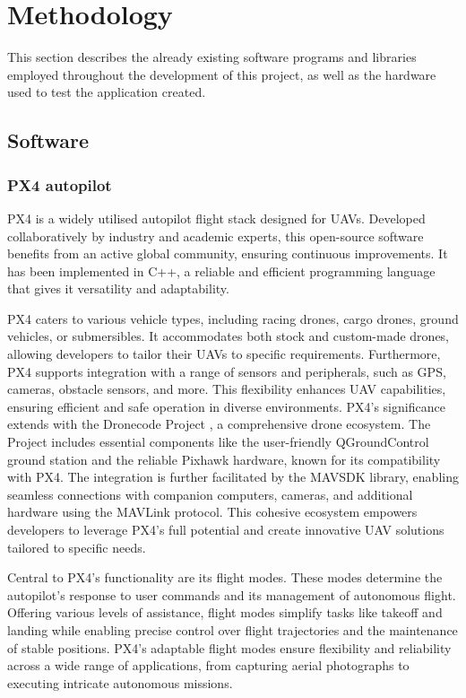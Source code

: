 \section{Methodology}

This section describes the already existing software programs and libraries employed throughout the development of this project, as well as the hardware used to test the application created.

\subsection{Software}

\subsubsection{PX4 autopilot}
\label{subsec:px4}

PX4 \cite{px4-front} is a widely utilised autopilot flight stack designed for UAVs. Developed collaboratively by industry and academic experts, this open-source software benefits from an active global community, ensuring continuous improvements. It has been implemented in C++, a reliable and efficient programming language that gives it versatility and adaptability.

PX4 caters to various vehicle types, including racing drones, cargo drones, ground vehicles, or submersibles. It accommodates both stock and custom-made drones, allowing developers to tailor their UAVs to specific requirements. Furthermore, PX4 supports integration with a range of sensors and peripherals, such as GPS, cameras, obstacle sensors, and more. This flexibility enhances UAV capabilities, ensuring efficient and safe operation in diverse environments.
PX4's significance extends with the Dronecode Project \cite{dronecode-front}, a comprehensive drone ecosystem. The Project includes essential components like the user-friendly QGroundControl ground station and the reliable Pixhawk hardware, known for its compatibility with PX4. The integration is further facilitated by the MAVSDK library, enabling seamless connections with companion computers, cameras, and additional hardware using the MAVLink protocol. This cohesive ecosystem empowers developers to leverage PX4's full potential and create innovative UAV solutions tailored to specific needs.

Central to PX4's functionality are its flight modes. These modes determine the autopilot's response to user commands and its management of autonomous flight. Offering various levels of assistance, flight modes simplify tasks like takeoff and landing while enabling precise control over flight trajectories and the maintenance of stable positions. PX4's adaptable flight modes ensure flexibility and reliability across a wide range of applications, from capturing aerial photographs to executing intricate autonomous missions.

